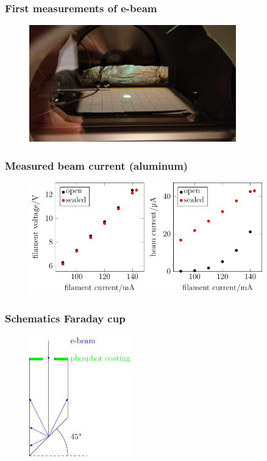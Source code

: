 \documentclass[aspectratio=169]{beamer}
\begin{document}
\begin{frame}
	\frametitle{First measurements of e-beam}
	\begin{figure}[h]
		\centering
		\includegraphics[width=0.8\textwidth]{../Chapters/beam-characterization/center_image}
	\end{figure}
\end{frame}


\begin{frame}
	\frametitle{Measured beam current (aluminum)}
	\begin{figure}[h]
		\centering
		\includegraphics[width=0.9\textwidth]{../Figures/Thesis-figure4.pdf}
	\end{figure}
\end{frame}


\begin{frame}
	\frametitle{Schematics Faraday cup}
	\begin{figure}[h]
		\centering
		\includegraphics[width=0.4\textwidth]{../Figures/Thesis-figure5.pdf}
	\end{figure}
\end{frame}
\end{document}
